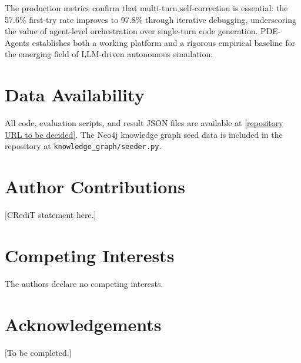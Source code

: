 \documentclass[twocolumn]{article}
\begin{document}
The production metrics confirm that multi-turn self-correction is essential:
the 57.6\% first-try rate improves to 97.8\% through iterative debugging,
underscoring the value of agent-level orchestration over single-turn
code generation.  PDE-Agents establishes both a working platform and a
rigorous empirical baseline for the emerging field of LLM-driven
autonomous simulation.

\section*{Data Availability}
All code, evaluation scripts, and result JSON files are available at
\href{https://github.com/[repo]}{[repository URL to be decided]}.  The Neo4j knowledge
graph seed data is included in the repository at \texttt{knowledge\_graph/seeder.py}.

\section*{Author Contributions}
[CRediT statement here.]

\section*{Competing Interests}
The authors declare no competing interests.

\section*{Acknowledgements}
[To be completed.]



\end{document}
